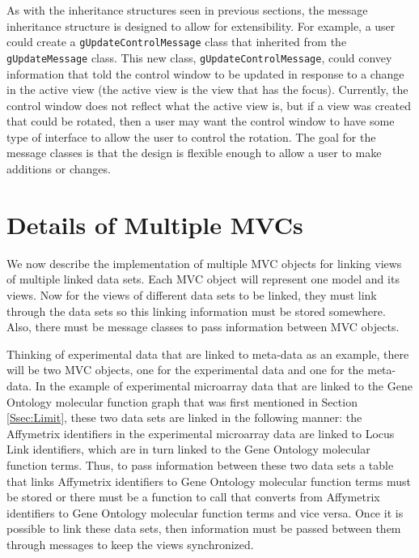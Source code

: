 \documentclass{article}[11pt]
\newcommand{\Robject}[1]{{\texttt{#1}}}
\begin{document}
As with the inheritance structures seen in previous sections, the message
inheritance structure is designed to allow for extensibility.  For example, a
user could create a \Robject{gUpdateControlMessage} class that inherited from
the \Robject{gUpdateMessage} class.  This new class,
\Robject{gUpdateControlMessage}, could convey information that told the
control window to be updated in response to a change in the active view (the
active view is the view that has the focus).  Currently, the control window
does not reflect what the active view is, but if a view was created that could
be rotated, then a user may want the control window to have some type of
interface to allow the user to control the rotation.  The goal for the message
classes is that the design is flexible enough to allow a user to make
additions or changes. 

\section{Details of Multiple MVCs}\label{Sec:MultMVC}

We now describe the implementation of multiple MVC objects for linking views
of multiple linked data sets.  Each MVC object will represent one model and
its views.  Now for the views of different data sets to be linked, they must
link through the data sets so this linking information must be stored
somewhere.  Also, there must be message classes to pass information between
MVC objects. 

Thinking of experimental data that are linked to meta-data as an example, there
will be two MVC objects, one for the experimental data and one for the
meta-data.  In the example of experimental microarray data that are linked to
the Gene Ontology molecular function graph that was first mentioned in Section
\ref{Ssec:Limit}, these two data sets are linked in the following manner: the
Affymetrix identifiers in the experimental microarray data are linked to Locus
Link identifiers, which are in turn linked to the Gene Ontology molecular
function terms.  Thus, to pass information between these two data sets a table
that links Affymetrix identifiers to Gene Ontology molecular function terms
must be stored or there must be a function to call that converts from
Affymetrix identifiers to Gene Ontology molecular function terms and vice
versa.  Once it is possible to link these data sets, then information must be
passed between them through messages to keep the views synchronized.
\end{document}
